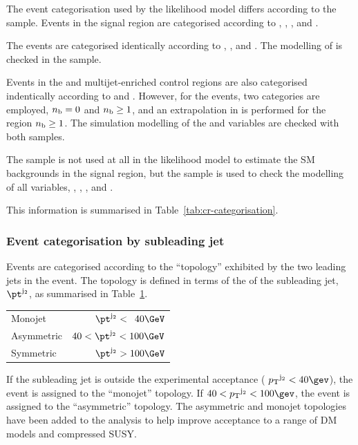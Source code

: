 The event categorisation used by the likelihood model differs
according to the sample. Events in the signal region are categorised
according to \njet, \nb, \scalht, and \HTmiss. 

The \mj events are categorised identically according to \njet, \nb,
and \scalht. The modelling of \HTmiss is checked in the \mj sample.

Events in the \mmj and multijet-enriched control regions are also
categorised indentically according to \njet and \scalht. However, for
the \mmj events, two \nb categories are employed, $n_{\text{b}} = 0$ and $n_{\text{b}}
\geq 1$, and an extrapolation in \nb is performed for the region $n_{\text{b}}
\geq 1$. The simulation modelling of the \nb and \mht variables are
checked with both samples.

The \gj sample is not used at all in the likelihood model to estimate
the SM backgrounds in the signal region, but the \gj sample is used to
check the modelling of all variables, \njet, \nb, \scalht, and
\HTmiss. 

This information is summarised in Table~\ref{tab:cr-categorisation}.

\subsubsection{Event categorisation by subleading jet \texorpdfstring{\Pt}{pT}}
\label{sec:subleading-jet}

Events are categorised according to the ``topology'' exhibited by the
two leading jets in the event. The topology is defined in terms of the
\Pt of the subleading jet, $\pt^{\mathrm{j_2}}$, as summarised in
Table~\ref{tab:subleading-jet}.

\begin{table}[h!]
  \label{tab:subleading-jet}
  \centering
  \begin{tabular}{ lr }
    \hline
    Monojet    & $\pt^{\mathrm{j_2}} < \phantom{1}40\GeV$       \\
    Asymmetric & $40 < \pt^{\mathrm{j_2}} < 100\GeV$ \\
    Symmetric  & $\pt^{\mathrm{j_2}} > 100\GeV$      \\
    \hline
  \end{tabular}
\end{table}

If the subleading jet is outside the experimental acceptance (\ie
$\Pt^{\mathrm j_2} < 40\gev$), the event is assigned to the
``monojet'' topology. If $40 < \Pt^{\mathrm j_2} < 100\gev$, the event
is assigned to the ``asymmetric'' topology. The asymmetric and monojet
topologies have been added to the analysis to help improve acceptance
to a range of DM models and compressed SUSY.

